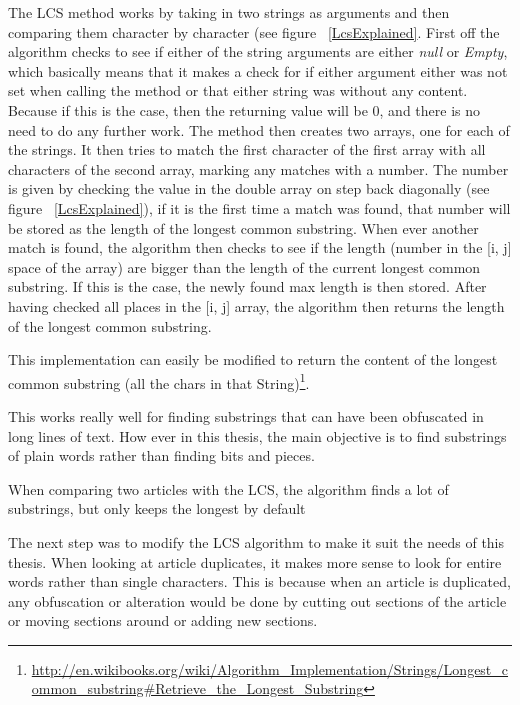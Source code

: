 The LCS method works by taking in two strings as arguments and then comparing them character by character (see figure ~\ref{LcsExplained}. First off the algorithm checks to see if either of the string arguments are either \textit{null} or \textit{Empty}, which basically means that it makes a check for if either argument either was not set when calling the method or that either string was without any content. Because if this is the case, then the returning value will be 0, and there is no need to do any further work. The method then creates two arrays, one for each of the strings. It then tries to match the first character of the first array with all characters of the second array, marking any matches with a number. The number is given by checking the value in the double array on step back diagonally (see figure ~\ref{LcsExplained}), if it is the first time a match was found, that number will be stored as the length of the longest common substring. When ever another match is found, the algorithm then checks to see if the length (number in the [i, j] space of the array) are bigger than the length of the current longest common substring. If this is the case, the newly found max length is then stored. After having checked all places in the [i, j] array, the algorithm then returns the length of the longest common substring.

This implementation can easily be modified to return the content of the longest common substring (all the chars in that String)\footnote{\url{http://en.wikibooks.org/wiki/Algorithm_Implementation/Strings/Longest_common_substring\#Retrieve_the_Longest_Substring}}.

This works really well for finding substrings that can have been obfuscated in long lines of text. How ever in this thesis, the main objective is to find substrings of plain words rather than finding bits and pieces.

When comparing two articles with the LCS, the algorithm finds a lot of substrings, but only keeps the longest by default

The next step was to modify the LCS algorithm to make it suit the needs of this thesis. When looking at article duplicates, it makes more sense to look for entire words rather than single characters. This is because when an article is duplicated, any obfuscation or alteration would be done by cutting out sections of the article or moving sections around or adding new sections.

